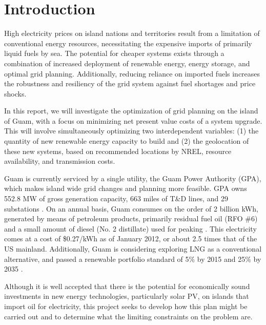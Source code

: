 \documentclass[12pt,letterpaper,fleqn]{report}
\begin{document}



\section{Introduction}

High electricity prices on island nations and territories result from
a limitation of conventional energy resources, necessitating the
expensive imports of primarily liquid fuels by sea. The potential for
cheaper systems exists through a combination of increased deployment
of renewable energy, energy storage, and optimal grid
planning. Additionally, reducing reliance on imported fuels increases
the robustness and resiliency of the grid system against fuel
shortages and price shocks.

In this report, we will investigate the optimization of grid planning
on the island of Guam, with a focus on minimizing net present value
costs of a system upgrade. This will involve simultaneously optimizing
two interdependent variables: (1) the quantity of new renewable energy
capacity to build and (2) the geolocation of these new systems, based
on recommended locations by NREL, resource availability, and
transmission costs.

Guam is currently serviced by a single utility, the Guam Power
Authority (GPA), which makes island wide grid changes and planning
more feasible. GPA owns 552.8 MW of gross generation capacity, 663
miles of T\&D lines, and 29 substations \cite{gpa14a}. On an annual
basis, Guam consumes on the order of 2 billion kWh, generated by means
of petroleum products, primarily residual fuel oil (RFO \#6) and a
small amount of diesel (No. 2 distillate) used for peaking
\cite{gpa14a, eia12}. This electricity comes at a cost of \$0.27/kWh
as of January 2012, or about 2.5 times that of the US
mainland. Additionally, Guam is considering exploring LNG as a
conventional alternative, and passed a renewable portfolio standard of
5\% by 2015 and 25\% by 2035 \cite{eia12}.

Although it is well accepted that there is the potential for
economically sound investments in new energy technologies,
particularly solar PV, on islands that import oil for electricity,
this project seeks to develop how this plan might be carried out and
to determine what the limiting constraints on the problem are.
\end{document}
